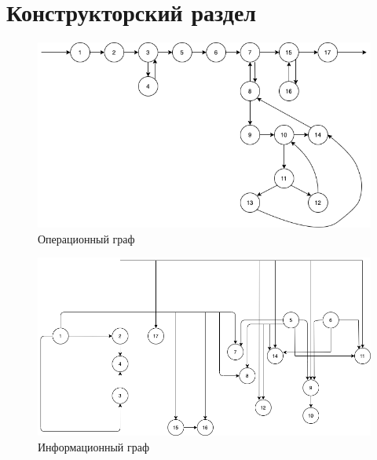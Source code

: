 \chapter{Конструкторский раздел}

\begin{figure}[h!]
	\begin{center}
		\includegraphics[scale=0.6]{assets/0.png}
	\end{center}
	\caption{Операционный граф}
\end{figure}

\begin{figure}[h!]
	\begin{center}
		\includegraphics[scale=0.6]{assets/1.png}
	\end{center}
	\caption{Информационный граф}
\end{figure}


